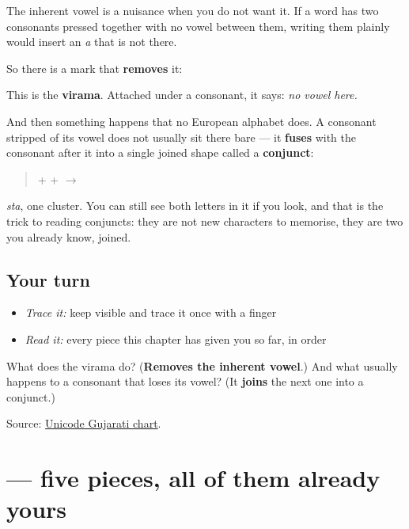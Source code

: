 The inherent vowel is a nuisance when you do not want it. If a word has two consonants pressed together with no vowel between them, writing them plainly would insert an \emph{a} that is not there.

So there is a mark that \textbf{removes} it:

\begin{quote}
\end{quote}

This is the \textbf{virama}. Attached under a consonant, it says: \emph{no vowel here.}

And then something happens that no European alphabet does. A consonant stripped of its vowel does not usually sit there bare — it \textbf{fuses} with the consonant after it into a single joined shape called a \textbf{conjunct}:

\begin{quote}
\textbf{} + \textbf{} + \textbf{} $\to$ \textbf{}
\end{quote}

\emph{sta}, one cluster. You can still see both letters in it if you look, and that is the trick to reading conjuncts: they are not new characters to memorise, they are two you already know, joined.

\subsection*{Your turn}
\begin{itemize}
\raggedright
  \item \emph{Trace it:} keep  visible and trace it once with a finger
  \item \emph{Read it:} every piece this chapter has given you so far, in order
\end{itemize}

\begin{tcolorbox}[breakable,colback=teal!4,colframe=teal!35!black,title={Before you move on}]
What does the virama do? (\textbf{Removes the inherent vowel}.) And what usually happens to a consonant that loses its vowel? (It \textbf{joins} the next one into a conjunct.)

Source: \href{https://www.unicode.org/charts/PDF/U0A80.pdf}{Unicode Gujarati chart}.
\end{tcolorbox}
\section[\texorpdfstring{\gu{નમસ્તે} (namaste)}{નમસ્તે (namaste)}]{ — five pieces, all of them already yours}

